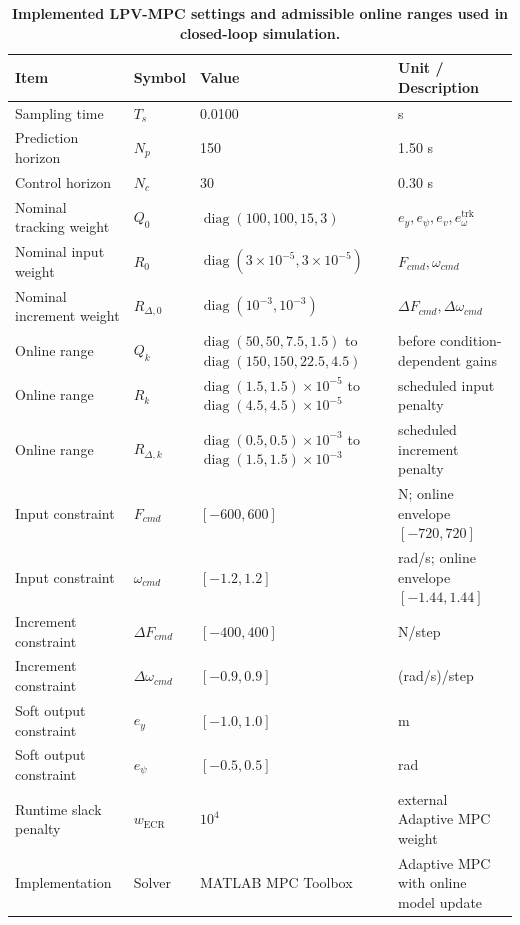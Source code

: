 \documentclass{ieeeaccess}
\begin{document}
\begin{table}[!tbp]
\centering
\caption{\textbf{Implemented LPV-MPC settings and admissible online ranges used in closed-loop simulation.}}
\label{tab:mpc_settings}
\setlength{\tabcolsep}{3pt}
\begin{tabular}{|p{}|p{}|p{}|p{}|}
\hline
Item & Symbol & Value & Unit / Description \\
\hline
Sampling time & $T_s$ & 0.0100 & s \\
Prediction horizon & $N_p$ & 150 & 1.50 s \\
Control horizon & $N_c$ & 30 & 0.30 s \\
Nominal tracking weight & $Q_0$ & $\operatorname{diag}(100,100,15,3)$ & $e_y,e_\psi,e_v,e_\omega^{\mathrm{trk}}$ \\
Nominal input weight & $R_0$ & $\operatorname{diag}(3\!\times\!10^{-5},3\!\times\!10^{-5})$ & $F_{cmd},\omega_{cmd}$ \\
Nominal increment weight & $R_{\Delta,0}$ & $\operatorname{diag}(10^{-3},10^{-3})$ & $\Delta F_{cmd},\Delta\omega_{cmd}$ \\
Online range & $Q_k$ & $\operatorname{diag}(50,50,7.5,1.5)$ to $\operatorname{diag}(150,150,22.5,4.5)$ & before condition-dependent gains \\
Online range & $R_k$ & $\operatorname{diag}(1.5,1.5)\!\times\!10^{-5}$ to $\operatorname{diag}(4.5,4.5)\!\times\!10^{-5}$ & scheduled input penalty \\
Online range & $R_{\Delta,k}$ & $\operatorname{diag}(0.5,0.5)\!\times\!10^{-3}$ to $\operatorname{diag}(1.5,1.5)\!\times\!10^{-3}$ & scheduled increment penalty \\
Input constraint & $F_{cmd}$ & $[-600,600]$ & N; online envelope $[-720,720]$ \\
Input constraint & $\omega_{cmd}$ & $[-1.2,1.2]$ & rad/s; online envelope $[-1.44,1.44]$ \\
Increment constraint & $\Delta F_{cmd}$ & $[-400,400]$ & N/step \\
Increment constraint & $\Delta\omega_{cmd}$ & $[-0.9,0.9]$ & (rad/s)/step \\
Soft output constraint & $e_y$ & $[-1.0,1.0]$ & m \\
Soft output constraint & $e_\psi$ & $[-0.5,0.5]$ & rad \\
Runtime slack penalty & $w_{\mathrm{ECR}}$ & $10^4$ & external Adaptive MPC weight \\
Implementation & Solver & MATLAB MPC Toolbox & Adaptive MPC with online model update \\
\hline
\end{tabular}
\end{table}
\end{document}
